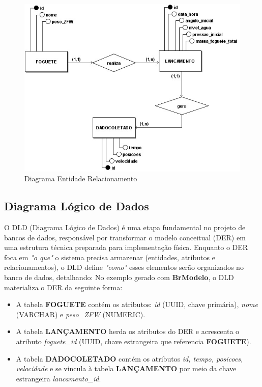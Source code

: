 \begin{figure}[H]
\centering
\includegraphics[width=1\linewidth]{editaveis/figuras/diagrama_EntidadeRelacionamento.png}
\caption{Diagrama Entidade Relacionamento}
\label{fig:enter-label}
\end{figure}

\subsection{Diagrama Lógico de Dados}

O DLD (Diagrama Lógico de Dados) é uma etapa fundamental no projeto de bancos de dados, responsável por transformar o modelo conceitual (DER) em uma estrutura técnica preparada para implementação física. Enquanto o DER foca em \textit{"o que"} o sistema precisa armazenar (entidades, atributos e relacionamentos), o DLD define \textit{"como"} esses elementos serão organizados no banco de dados, detalhando: No exemplo gerado com \textbf{BrModelo}, o DLD materializa o DER da seguinte forma:

\begin{itemize}
  \item A tabela \textbf{FOGUETE} contém os atributos: \textit{id} (UUID, chave primária), \textit{nome} (VARCHAR) e \textit{peso\_ZFW} (NUMERIC).
  
  \item A tabela \textbf{LANÇAMENTO} herda os atributos do DER e acrescenta o atributo \textit{foguete\_id} (UUID, chave estrangeira que referencia \textbf{FOGUETE}).

  \item A tabela \textbf{DADOCOLETADO} contém os atributos \textit{id, tempo, posicoes, velocidade} e se vincula à tabela \textbf{LANÇAMENTO} por meio da chave estrangeira \textit{lancamento\_id}.
\end{itemize}

